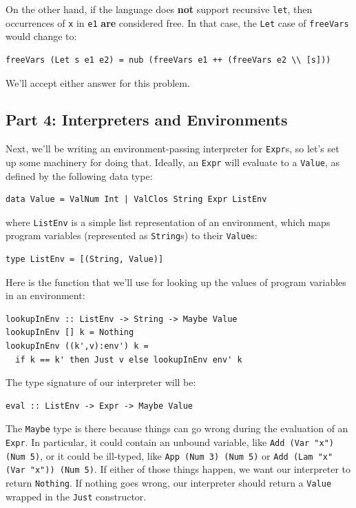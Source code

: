 \documentclass[addpoints]{exam}
\begin{document}
\begin{questions}
\begin{solutionorbox}[\stretch{1}]
On the other hand, if the language does \textbf{not} support recursive \verb|let|, then occurrences of \verb|x| in \verb|e1| \textbf{are} considered free. In that case, the \verb|Let| case of \verb|freeVars| would change to:
\begin{verbatim}
freeVars (Let s e1 e2) = nub (freeVars e1 ++ (freeVars e2 \\ [s]))
\end{verbatim}
We'll accept either answer for this problem.
\end{solutionorbox}

\newpage

\subsection*{\textbf{Part 4: Interpreters and Environments}}

\question[20] Next, we'll be writing an environment-passing interpreter for \verb|Expr|s, so let's set up some machinery for doing that.  Ideally, an \verb|Expr| will evaluate to a \verb|Value|, as defined by the following data type:

\begin{verbatim}
data Value = ValNum Int | ValClos String Expr ListEnv
\end{verbatim}

where \verb|ListEnv| is a simple list representation of an environment, which maps program variables (represented as \verb|String|s) to their \verb|Value|s:

\begin{verbatim}
type ListEnv = [(String, Value)]
\end{verbatim}

Here is the function that we'll use for looking up the values of program variables in an environment:

\begin{verbatim}
lookupInEnv :: ListEnv -> String -> Maybe Value
lookupInEnv [] k = Nothing
lookupInEnv ((k',v):env') k =
  if k == k' then Just v else lookupInEnv env' k
\end{verbatim}

The type signature of our interpreter will be:

\begin{verbatim}
eval :: ListEnv -> Expr -> Maybe Value
\end{verbatim}

The \verb|Maybe| type is there because things can go wrong during the evaluation of an \verb|Expr|.  In particular, it could contain an unbound variable, like \verb|Add (Var "x") (Num 5)|, or it could be ill-typed, like \verb|App (Num 3) (Num 5)| or \verb|Add (Lam "x" (Var "x")) (Num 5)|.  If either of those things happen, we want our interpreter to return \verb|Nothing|.  If nothing goes wrong, our interpreter should return a \verb|Value| wrapped in the \verb|Just| constructor.


\end{questions}
\end{document}
